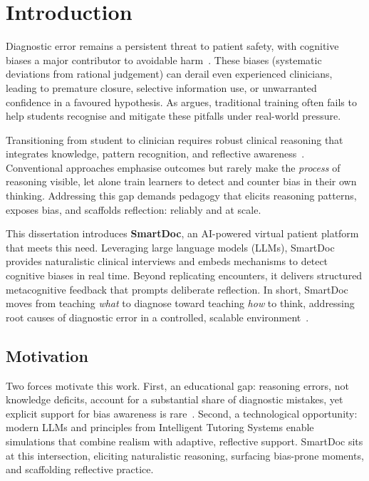 \chapter{Introduction}
\label{chap:chap1}

Diagnostic error remains a persistent threat to patient safety, with cognitive biases a major contributor to avoidable harm~\parencite{graber_diagnostic_2005}. These biases (systematic deviations from rational judgement) can derail even experienced clinicians, leading to premature closure, selective information use, or unwarranted confidence in a favoured hypothesis. As \textcite{croskerry_importance_2003} argues, traditional training often fails to help students recognise and mitigate these pitfalls under real-world pressure.

Transitioning from student to clinician requires robust clinical reasoning that integrates knowledge, pattern recognition, and reflective awareness~\parencite{audetat_diagnosis_2017}. Conventional approaches emphasise outcomes but rarely make the \emph{process} of reasoning visible, let alone train learners to detect and counter bias in their own thinking. Addressing this gap demands pedagogy that elicits reasoning patterns, exposes bias, and scaffolds reflection: reliably and at scale.

This dissertation introduces \textbf{SmartDoc}, an AI-powered virtual patient platform that meets this need. Leveraging large language models (LLMs), SmartDoc provides naturalistic clinical interviews and embeds mechanisms to detect cognitive biases in real time. Beyond replicating encounters, it delivers structured metacognitive feedback that prompts deliberate reflection. In short, SmartDoc moves from teaching \emph{what} to diagnose toward teaching \emph{how} to think, addressing root causes of diagnostic error in a controlled, scalable environment~\parencite{mamede_structure_2004,berge_cognitive_2013}.

\section{Motivation}
\label{sec:se1}

Two forces motivate this work. First, an educational gap: reasoning errors, not knowledge deficits, account for a substantial share of diagnostic mistakes, yet explicit support for bias awareness is rare~\parencite{berge_cognitive_2013}. Second, a technological opportunity: modern LLMs and principles from Intelligent Tutoring Systems enable simulations that combine realism with adaptive, reflective support. SmartDoc sits at this intersection, eliciting naturalistic reasoning, surfacing bias-prone moments, and scaffolding reflective practice.

